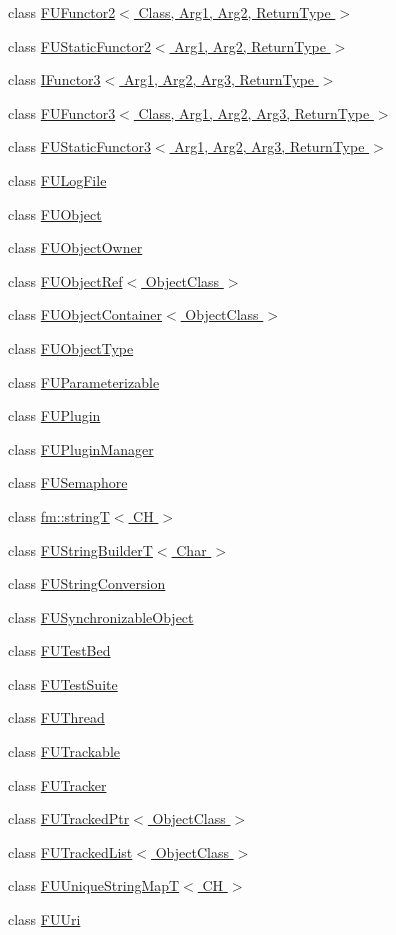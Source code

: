 \begin{DoxyCompactItemize}
\item 
class \hyperlink{classFUFunctor2}{FUFunctor2$<$ Class, Arg1, Arg2, ReturnType $>$}
\item 
class \hyperlink{classFUStaticFunctor2}{FUStaticFunctor2$<$ Arg1, Arg2, ReturnType $>$}
\item 
class \hyperlink{classIFunctor3}{IFunctor3$<$ Arg1, Arg2, Arg3, ReturnType $>$}
\item 
class \hyperlink{classFUFunctor3}{FUFunctor3$<$ Class, Arg1, Arg2, Arg3, ReturnType $>$}
\item 
class \hyperlink{classFUStaticFunctor3}{FUStaticFunctor3$<$ Arg1, Arg2, Arg3, ReturnType $>$}
\item 
class \hyperlink{classFULogFile}{FULogFile}
\item 
class \hyperlink{classFUObject}{FUObject}
\item 
class \hyperlink{classFUObjectOwner}{FUObjectOwner}
\item 
class \hyperlink{classFUObjectRef}{FUObjectRef$<$ ObjectClass $>$}
\item 
class \hyperlink{classFUObjectContainer}{FUObjectContainer$<$ ObjectClass $>$}
\item 
class \hyperlink{classFUObjectType}{FUObjectType}
\item 
class \hyperlink{classFUParameterizable}{FUParameterizable}
\item 
class \hyperlink{classFUPlugin}{FUPlugin}
\item 
class \hyperlink{classFUPluginManager}{FUPluginManager}
\item 
class \hyperlink{classFUSemaphore}{FUSemaphore}
\item 
class \hyperlink{classfm_1_1stringT}{fm::stringT$<$ CH $>$}
\item 
class \hyperlink{classFUStringBuilderT}{FUStringBuilderT$<$ Char $>$}
\item 
class \hyperlink{classFUStringConversion}{FUStringConversion}
\item 
class \hyperlink{classFUSynchronizableObject}{FUSynchronizableObject}
\item 
class \hyperlink{classFUTestBed}{FUTestBed}
\item 
class \hyperlink{classFUTestSuite}{FUTestSuite}
\item 
class \hyperlink{classFUThread}{FUThread}
\item 
class \hyperlink{classFUTrackable}{FUTrackable}
\item 
class \hyperlink{classFUTracker}{FUTracker}
\item 
class \hyperlink{classFUTrackedPtr}{FUTrackedPtr$<$ ObjectClass $>$}
\item 
class \hyperlink{classFUTrackedList}{FUTrackedList$<$ ObjectClass $>$}
\item 
class \hyperlink{classFUUniqueStringMapT}{FUUniqueStringMapT$<$ CH $>$}
\item 
class \hyperlink{classFUUri}{FUUri}
\end{DoxyCompactItemize}

